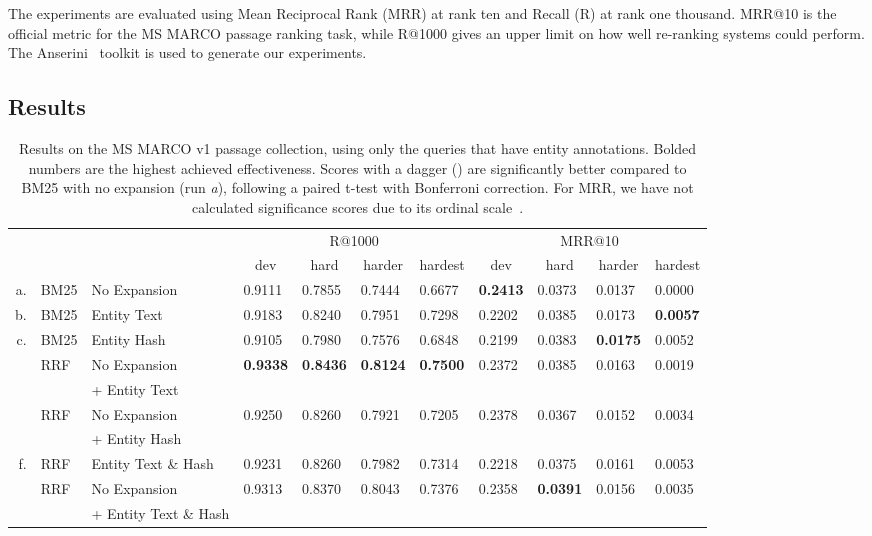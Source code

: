 The experiments are evaluated using Mean Reciprocal Rank (MRR) at rank ten and Recall (R) at rank one thousand. MRR@10 is the official metric for the MS MARCO passage ranking task, while R@1000 gives an upper limit on how well re-ranking systems could perform. The Anserini~\citep{anserini} toolkit is used to generate our experiments. 

\subsection{Results}
\begin{table}
	\centering
	\caption{Results on the MS MARCO v1 passage collection, using only the queries that have entity annotations. Bolded numbers are the highest achieved effectiveness. Scores with a dagger (\dag) are significantly better compared to BM25 with no expansion (run \emph{a}), following a paired t-test with Bonferroni correction. For MRR, we have not calculated significance scores due to its ordinal scale~\citep{fuhr-mrr}.}
	\tabcolsep=0.11cm
	\begin{tabular}{rll|llll|llll}
		\toprule
		\multirow{2}{*}{}
		& & & \multicolumn{4}{c|}{R@1000} & \multicolumn{4}{c}{MRR@10} \\
		& & & \multicolumn{1}{c}{dev} & \multicolumn{1}{c}{hard} & \multicolumn{1}{c}{harder} & \multicolumn{1}{c|}{hardest} & \multicolumn{1}{c}{dev} & \multicolumn{1}{c}{hard} & \multicolumn{1}{c}{harder} & \multicolumn{1}{c}{hardest} \\
		\midrule
		a. & BM25 & No Expansion                       & 0.9111 & 0.7855 & 0.7444 & 0.6677 & \textbf{0.2413} & 0.0373 & 0.0137 & 0.0000 \\
		b. & BM25 & Entity Text                        & 0.9183 & 0.8240\dag & 0.7951\dag & 0.7298\dag & 0.2202 & 0.0385 & 0.0173 & \textbf{0.0057} \\
		c. & BM25 & Entity Hash                        & 0.9105 & 0.7980 & 0.7576 & 0.6848 & 0.2199 & 0.0383 & \textbf{0.0175} & 0.0052 \\ \midrule
		\multirow{2}{*}{}
		d. & RRF & No Expansion          & \textbf{0.9338}\dag & \textbf{0.8436}\dag & \textbf{0.8124}\dag & \textbf{0.7500}\dag & 0.2372 & 0.0385 & 0.0163 & 0.0019 \\
		& & + Entity Text &&&&&&&& \\
		\multirow{2}{*}{}
		e. & RRF &  No Expansion     & 0.9250\dag & 0.8260\dag & 0.7921\dag & 0.7205\dag & 0.2378 & 0.0367 & 0.0152 & 0.0034 \\
		&&  + Entity Hash  &&&&&&&& \\
		f. & RRF & Entity Text \& Hash                 & 0.9231 & 0.8260\dag & 0.7982\dag & 0.7314\dag & 0.2218 & 0.0375 & 0.0161 & 0.0053 \\
		\multirow{2}{*}{}
		g. & RRF & No Expansion   & 0.9313\dag & 0.8370\dag & 0.8043\dag & 0.7376\dag & 0.2358 & \textbf{0.0391} & 0.0156 & 0.0035 \\
		&& + Entity Text \& Hash &&&&&&&& \\
		\bottomrule 
	\end{tabular}
	\label{tab:results-table}
\end{table}

